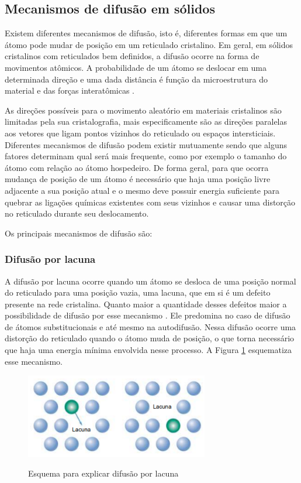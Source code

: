 \documentclass[]{politex}
\begin{document}
\subsection{Mecanismos de difusão em sólidos}
	Existem diferentes mecanismos de difusão, isto é, diferentes formas em que um átomo pode mudar de posição em um reticulado cristalino. Em geral, em sólidos cristalinos com reticulados bem definidos, a difusão ocorre na forma de movimentos atômicos. A probabilidade de um átomo se deslocar em uma determinada direção e uma dada distância é função da microestrutura do material e das forças interatômicas \cite{glicksman2000diffusion}.
	
	As direções possíveis para o movimento aleatório em materiais cristalinos são limitadas pela sua cristalografia, mais especificamente são as direções paralelas aos vetores que ligam pontos vizinhos do reticulado ou espaços intersticiais.
	Diferentes mecanismos de difusão podem existir mutuamente sendo que alguns fatores determinam qual será mais frequente, como por exemplo o tamanho do átomo com relação ao átomo hospedeiro. De forma geral, para que ocorra mudança de posição de um átomo é necessário que haja uma posição livre adjacente a sua posição atual e o mesmo deve possuir energia suficiente para quebrar as ligações químicas existentes com seus vizinhos e causar uma distorção no reticulado durante seu deslocamento. \par

Os principais mecanismos de difusão são:
\subsubsection{Difusão por lacuna}
A difusão por lacuna ocorre quando um átomo se desloca de uma posição normal do reticulado para uma posição vazia, uma lacuna, que em si é um defeito presente na rede cristalina. Quanto maior a quantidade desses defeitos maior a possibilidade de difusão por esse mecanismo \cite{callister2007materials}. Ele predomina no caso de difusão de átomos substitucionais e até mesmo na autodifusão. Nessa difusão ocorre uma distorção do reticulado quando o átomo muda de posição, o que torna necessário que haja uma energia mínima envolvida nesse processo. A Figura \ref{fig:dif-lacuna} esquematiza esse mecanismo.

\begin{figure}[ht]
	\caption{Esquema para explicar difusão por lacuna}
	\includegraphics[width=80mm,scale=0.5]{dif-lacuna}
	\label{fig:dif-lacuna}
	\centering
\end{figure}
\end{document}
